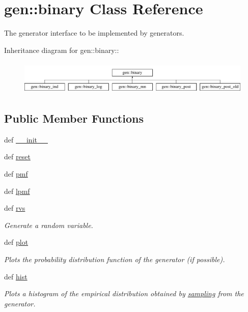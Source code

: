 \hypertarget{classgen_1_1binary}{
\section{gen::binary Class Reference}
\label{classgen_1_1binary}
}
The generator interface to be implemented by generators.  


Inheritance diagram for gen::binary::\begin{figure}[H]
\begin{center}
\leavevmode
\includegraphics[height=1.63504cm]{classgen_1_1binary}
\end{center}
\end{figure}
\subsection*{Public Member Functions}
\begin{CompactItemize}
\item 
def \hyperlink{classgen_1_1binary_705669a0b9879ed4c0f3b1d7ebac7163}{\_\-\_\-init\_\-\_\-}
\item 
def \hyperlink{classgen_1_1binary_8fd0271b697cfd36fc72a5e3dadbd908}{reset}
\item 
def \hyperlink{classgen_1_1binary_2a0d104e1d99419fa3c5e7bf5db96e9e}{pmf}
\item 
def \hyperlink{classgen_1_1binary_0377b3ffdd44806d72453d0b8ead1758}{lpmf}
\item 
def \hyperlink{classgen_1_1binary_02fc0fab1e701e3f02f564eb7577e0d2}{rvs}
\begin{CompactList}\small\item\em Generate a random variable. \item\end{CompactList}\item 
def \hyperlink{classgen_1_1binary_07a67826e434eeb49aaef326d2e41805}{plot}
\begin{CompactList}\small\item\em Plots the probability distribution function of the generator (if possible). \item\end{CompactList}\item 
def \hyperlink{classgen_1_1binary_9cf0ff8452df83ccbae5ba1e56136645}{hist}
\begin{CompactList}\small\item\em Plots a histogram of the empirical distribution obtained by \hyperlink{namespacesampling}{sampling} from the generator. \item\end{CompactList}\end{CompactItemize}
